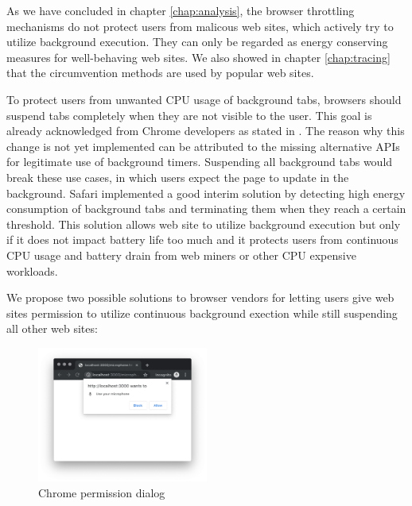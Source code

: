 \documentclass[
	ruledheaders=section,%
	class=report,%
	thesis={type=bachelor},%
	accentcolor=9c,%
	custommargins=true,%
	marginpar=false,%
	parskip=half-,%
	fontsize=11pt,%
]{tudapub}
\begin{document}
  As we have concluded in chapter \ref{chap:analysis}, the browser throttling mechanisms do not protect users from malicous web sites, which actively try to utilize background execution. They can only be regarded as energy conserving measures for well-behaving web sites. We also showed in chapter \ref{chap:tracing} that the circumvention methods are used by popular web sites.

  To protect users from unwanted CPU usage of background tabs, browsers should suspend tabs completely when they are not visible to the user. This goal is already acknowledged from Chrome developers as stated in \cite{chrome-background-tabs-roadmap}. The reason why this change is not yet implemented can be attributed to the missing alternative APIs for legitimate use of background timers. Suspending all background tabs would break these use cases, in which users expect the page to update in the background. Safari implemented a good interim solution by detecting high energy consumption of background tabs and terminating them when they reach a certain threshold. This solution allows web site to utilize background execution but only if it does not impact battery life too much and it protects users from continuous CPU usage and battery drain from web miners or other CPU expensive workloads.

  We propose two possible solutions to browser vendors for letting users give web sites permission to utilize continuous background exection while still suspending all other web sites:

  \begin{figure}
    \centering
    \includegraphics[width=0.5\textwidth]{images/microphone-permission.png}
    \caption{Chrome permission dialog}
    \label{fig:chrome-permission-dialog}
  \end{figure}
\end{document}
